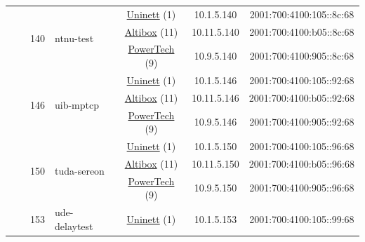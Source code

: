 \begin{small}
\begin{center}
\begin{longtable}{|c|c|c|c|c|c|c|c|}
  &  & \multirow{3}{*}{\tiny{140}} & \multicolumn{1}{|l|}{\multirow{3}{*}{\tiny{ntnu-test}}} & \multicolumn{2}{|c|}{\tiny{\href{https://www.uninett.no}{Uninett} (1)}} & \tiny{10.1.5.140} & \tiny{2001:700:4100:105::8c:68} \\* \cline{5-5}\cline{6-6}\cline{7-7}\cline{8-8}
  &  &  &  & \multicolumn{2}{|c|}{\tiny{\href{https://www.altibox.no}{Altibox} (11)}} & \tiny{10.11.5.140} & \tiny{2001:700:4100:b05::8c:68} \\* \cline{5-5}\cline{6-6}\cline{7-7}\cline{8-8}
  &  &  &  & \multicolumn{2}{|c|}{\tiny{\href{http://www.powertech.no}{PowerTech} (9)}} & \tiny{10.9.5.140} & \tiny{2001:700:4100:905::8c:68} \\* \cline{3-3}\cline{4-4}\cline{5-5}\cline{6-6}\cline{7-7}\cline{8-8}
  &  & \multirow{3}{*}{\tiny{146}} & \multicolumn{1}{|l|}{\multirow{3}{*}{\tiny{uib-mptcp}}} & \multicolumn{2}{|c|}{\tiny{\href{https://www.uninett.no}{Uninett} (1)}} & \tiny{10.1.5.146} & \tiny{2001:700:4100:105::92:68} \\* \cline{5-5}\cline{6-6}\cline{7-7}\cline{8-8}
  &  &  &  & \multicolumn{2}{|c|}{\tiny{\href{https://www.altibox.no}{Altibox} (11)}} & \tiny{10.11.5.146} & \tiny{2001:700:4100:b05::92:68} \\* \cline{5-5}\cline{6-6}\cline{7-7}\cline{8-8}
  &  &  &  & \multicolumn{2}{|c|}{\tiny{\href{http://www.powertech.no}{PowerTech} (9)}} & \tiny{10.9.5.146} & \tiny{2001:700:4100:905::92:68} \\* \cline{3-3}\cline{4-4}\cline{5-5}\cline{6-6}\cline{7-7}\cline{8-8}
  &  & \multirow{3}{*}{\tiny{150}} & \multicolumn{1}{|l|}{\multirow{3}{*}{\tiny{tuda-sereon}}} & \multicolumn{2}{|c|}{\tiny{\href{https://www.uninett.no}{Uninett} (1)}} & \tiny{10.1.5.150} & \tiny{2001:700:4100:105::96:68} \\* \cline{5-5}\cline{6-6}\cline{7-7}\cline{8-8}
  &  &  &  & \multicolumn{2}{|c|}{\tiny{\href{https://www.altibox.no}{Altibox} (11)}} & \tiny{10.11.5.150} & \tiny{2001:700:4100:b05::96:68} \\* \cline{5-5}\cline{6-6}\cline{7-7}\cline{8-8}
  &  &  &  & \multicolumn{2}{|c|}{\tiny{\href{http://www.powertech.no}{PowerTech} (9)}} & \tiny{10.9.5.150} & \tiny{2001:700:4100:905::96:68} \\* \cline{3-3}\cline{4-4}\cline{5-5}\cline{6-6}\cline{7-7}\cline{8-8}
  &  & \multirow{3}{*}{\tiny{153}} & \multicolumn{1}{|l|}{\multirow{3}{*}{\tiny{ude-delaytest}}} & \multicolumn{2}{|c|}{\tiny{\href{https://www.uninett.no}{Uninett} (1)}} & \tiny{10.1.5.153} & \tiny{2001:700:4100:105::99:68} \\* \cline{5-5}\cline{6-6}\cline{7-7}\cline{8-8}

\end{longtable}
\end{center}
\end{small}
